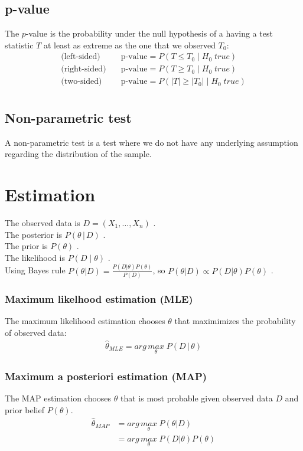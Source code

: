 \documentclass[../main.tex]{subfiles}
\begin{document}
\subsection{p-value}
The $p$-value is the probability under the null hypothesis of a having a test statistic $T$ at
least as extreme as the one that we observed $T_0$:
\begin{align*}
    \text{(left-sided)} \quad & \text{p-value} = P(T \leq T_0\; |\; H_0\; true) \\
    \text{(right-sided)}\quad & \text{p-value} = P(T \geq T_0\; |\; H_0\; true) \\
    \text{(two-sided)}  \quad & \text{p-value} = P(|T| \geq |T_0|\; |\; H_0\; true) \\
\end{align*}

\subsection{Non-parametric test}
A non-parametric test is a test where we do not have any underlying assumption regarding the
distribution of the sample.

\section{Estimation}
The observed data is $D = (X_1, \dots, X_n)$ . \\
The posterior is $P(\theta\, | \, D)$ . \\
The prior is $P(\theta)$ . \\
The likelihood is $P(D\; |\; \theta)$ . \\
Using Bayes rule $P(\theta | D) = \frac{P(D|\theta)P(\theta)}{P(D)}$,
so $P(\theta | D) \propto P(D|\theta)P(\theta)$ .

\subsubsection{Maximum likelhood estimation (MLE)}
 The maximum likelihood estimation chooses $\theta$ that maximimizes the probability of observed data:
\begin{align*}
    \hat{\theta}_{MLE} = arg\,\underset{\theta}{max}\; P(D\,|\, \theta)
\end{align*}

\subsubsection{Maximum a posteriori estimation (MAP)}
The MAP estimation chooses $\theta$ that is most probable given observed data $D$ and prior belief
$P(\theta)$. \\

\begin{align*}
    \hat{\theta}_{MAP} & = arg\,\underset{\theta}{max}\; P(\theta | D) \\
                       & = arg\,\underset{\theta}{max}\; P(D | \theta) P(\theta) \\
\end{align*}
\end{document}
